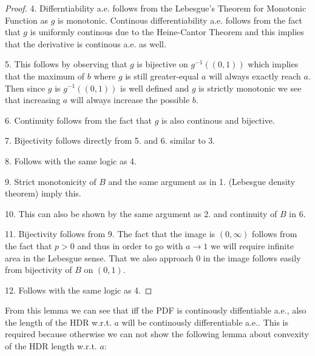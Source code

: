 \begin{proof}
    4. Differntiability a.e. follows from the Lebesgue's Theorem for Monotonic Function as $g$ is monotonic. Continous differentiability a.e. follows from the fact that $g$ is uniformly continous due to the Heine-Cantor Theorem and this implies that the derivative is continous a.e. as well. %

    5. This follows by observing that $g$ is bijective on $g^{-1}((0,1))$ which implies that the maximum of $b$ where $g$ is still greater-equal $a$ will always exactly reach $a$. Then since $g$ is $g^{-1}((0,1))$ is well defined and $g$ is strictly monotonic we see that increasing $a$ will always increase the possible $b$.

    6. Continuity follows from the fact that $g$ is also continous and bijective.

    7. Bijectivity follows directly from 5. and 6. similar to 3.

    8. Follows with the same logic as 4.

    9. Strict monotonicity of $B$ and the same argument as in 1. (Lebesgue density theorem) imply this.

    10. This can also be shown by the same argument as 2. and continuity of $B$ in 6.

    11. Bijectivity follows from 9. The fact that the image is $(0,\infty)$ follows from the fact that $p>0$ and thus in order to go with $a \to 1$ we will require infinite area in the Lebesgue sense. That we also approach $0$ in the image follows easily from bijectivity of $B$ on $(0,1)$.

    12. Follows with the same logic as 4.
\end{proof}

From this lemma we can see that iff the PDF is continously diffentiable a.e., also the length of the HDR w.r.t. $a$ will be continously differentiable a.e.. This is required because otherwise we can not show the following lemma about convexity of the HDR length w.r.t. $a$:


